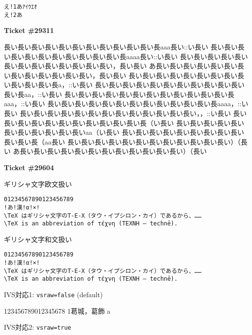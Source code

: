 \documentclass{article}
\begin{document}
\begin{lstlisting}
え!1あｱｲｳｴｵ
え!2あ
\end{lstlisting}
\newpage
\textbf{Ticket \#29311}

\begin{env}{\relax}
長い長い長い長い長い長い長い長い長い長い長い長aaa長い::い長い
長い長い長い長い長い長い長い長い長い長い長い長aaaa長い::い長い
長い長い長い長い長い長い長い長い長い長い長い長い長い，長い長い
あ長い長い長い長い長い長い長い長い長い長い長い長い長い，長い長い
長い長い長い長い長い長い長い長い長い長い長い長い長a，::い長い
長い長い長い長い長い長い長い長い長い長い長い長い長aa，::い長い
長い長い長い長い長い長い長い長い長い長い長い長い長aaa，::い長い
長い長い長い長い長い長い長い長い長い長い長い長い長aaaa，::い長い
長い長い長い長い長い長い長い長い長い長い長い長い長い，，::い長い
長い長い長い長い長い長い長い長い長い長い長い長（い長い
長い長い長い長い長い長い長い長い長い長い長いaa（い長い
長い長い長い長い長い長い長い長い長い長い長い長（aa長い
長い長い長い長い長い長い長い長い長い長い長い長い）（長い
あ長い長い長い長い長い長い長い長い長い長い長い長い）（長い
\end{env}

\newpage
\textbf{Ticket \#29604}

\setmonofont{DejaVu Sans Mono}
ギリシャ文字欧文扱い

\begin{lstlisting}[basewidth=.5em,basicstyle=\tt, emph={TeX}, emphstyle=\color{red}]
01234567890123456789
!あ!漢!α!×!
\TeX はギリシャ文字のΤ-Ε-Χ（タウ・イプシロン・カイ）であるから、……
\TeX is an abbreviation of τέχνη (ΤΕΧΝΗ – technē).
\end{lstlisting}

ギリシャ文字和文扱い

\begin{lstlisting}[basewidth=.5em,basicstyle=\tt, emph={TeX}, emphstyle=\color{red}]
01234567890123456789
!あ!漢!α!×!
\TeX はギリシャ文字のΤ-Ε-Χ（タウ・イプシロン・カイ）であるから、……
\TeX is an abbreviation of τέχνη (ΤΕΧΝΗ – technē).
\end{lstlisting}

\newpage
IVS対応1: \texttt{vsraw=false} (default)

\begin{LTXexample}[escapechar=\%, basicstyle=\tt]
123456789012345678
1葛󠄀城，葛󠄁飾
󠄀a
\end{LTXexample}

IVS対応2: \texttt{vsraw=true}
\end{document}
